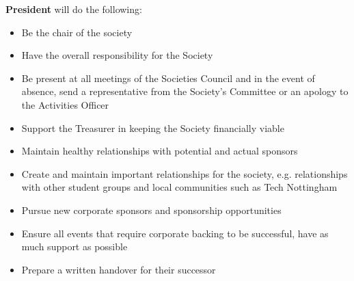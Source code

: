 \begin{subclause}
  \textbf{President} will do the following:
  \begin{itemize}[label=--,topsep=0em,itemsep=0em]
  	\item Be the chair of the society
    \item Have the overall responsibility for the Society
    \item Be present at all meetings of the Societies Council and in the event of absence, send a representative from the Society's Committee or an apology to the Activities Officer
    \item Support the Treasurer in keeping the Society financially viable
    \item Maintain healthy relationships with potential and actual sponsors
    \item Create and maintain important relationships for the society, e.g. relationships with other student groups and local communities such as Tech Nottingham
    \item Pursue new corporate sponsors and sponsorship opportunities
    \item Ensure all events that require corporate backing to be successful, have as much support as possible
    \item Prepare a written handover for their successor
  \end{itemize}
\end{subclause}
